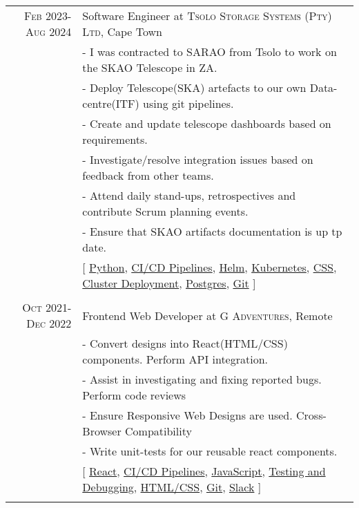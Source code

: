\documentclass[a4paper,10pt]{article} %
\begin{document}
\begin{tabular}{r|p{15cm}}
\textsc{Feb 2023-Aug 2024} & Software Engineer at \textsc{Tsolo Storage Systems (Pty) Ltd}, Cape Town \emph{}\\
& \footnotesize{- I was contracted to SARAO from Tsolo to work on the SKAO Telescope in ZA.}\\
& \footnotesize{- Deploy Telescope(SKA) artefacts to our own Data-centre(ITF) using git pipelines.}\\
& \footnotesize{- Create and update telescope dashboards based on requirements.}\\
& \footnotesize{- Investigate/resolve integration issues based on feedback from other teams.}\\
& \footnotesize{- Attend daily stand-ups, retrospectives and contribute Scrum planning events.}\\
& \footnotesize{- Ensure that SKAO artifacts documentation is up tp date.}\\
& \footnotesize{[ \href{https://www.python.org/}{Python}, \href{https://github.com/solutions/ci-cd}{CI/CD Pipelines}, \href{https://helm.sh/}{Helm}, \href{https://kubernetes.io/}{Kubernetes}, \href{https://datatracker.ietf.org/doc/html/rfc7993}{CSS}, \href{https://kubernetes.io/docs/concepts/workloads/controllers/deployment/}{Cluster Deployment}, \href{https://www.postgresql.org/}{Postgres}, \href{https://git-scm.com/}{Git}   ]}\\
\multicolumn{2}{c}{} \\


\textsc{Oct 2021-Dec 2022} & Frontend Web Developer at \textsc{G Adventures}, Remote \emph{}\\
& \footnotesize{- Convert designs into React(HTML/CSS) components. Perform API integration.}\\
& \footnotesize{- Assist in investigating and fixing reported bugs. Perform code reviews}\\
& \footnotesize{- Ensure Responsive Web Designs are used. Cross-Browser Compatibility}\\
& \footnotesize{- Write unit-tests for our reusable react components.}\\
& \footnotesize{[ \href{https://react.dev/}{React}, \href{https://github.com/solutions/ci-cd}{CI/CD Pipelines}, \href{https://developer.mozilla.org/en-US/docs/Web/JavaScript}{JavaScript}, \href{https://jestjs.io/}{Testing and Debugging}, \href{https://datatracker.ietf.org/doc/html/rfc7993}{HTML/CSS}, \href{https://git-scm.com/}{Git}, \href{https://slack.com/}{Slack} ]}\\
\multicolumn{2}{c}{} \\


\end{tabular}
\end{document}
